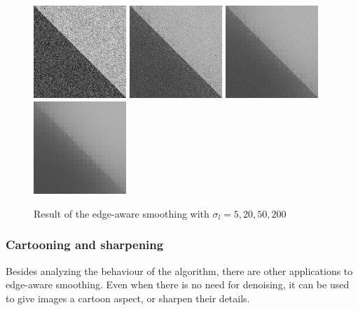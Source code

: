 \documentclass{article}
\begin{document}
\begin{figure}
    \centering
    \includegraphics[width=3.5cm]{../code/results/smoothing_diag_sigmal_100_10_5_new.png}
    \includegraphics[width=3.5cm]{../code/results/smoothing_diag_sigmal_100_10_20_new.png}
    \includegraphics[width=3.5cm]{../code/results/smoothing_diag_sigmal_100_10_50_new.png}
    \includegraphics[width=3.5cm]{../code/results/smoothing_diag_sigmal_100_10_200_new.png}
    \caption{Result of the edge-aware smoothing with $\sigma_{l} = 5, 20, 50, 200$}
    \label{fig:sigma_l}
\end{figure}

\subsubsection{Cartooning and sharpening}

Besides analyzing the behaviour of the algorithm, there are other applications to edge-aware smoothing. Even when there is no need for denoising, it can be used to give images a cartoon aspect, or sharpen their details.
\end{document}
